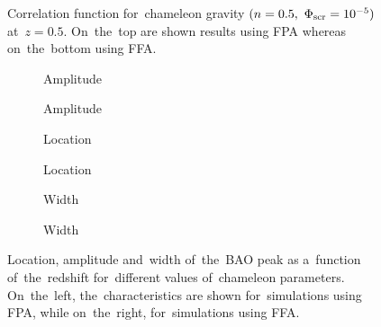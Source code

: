\begin{figure}
\centering
	\begin{subfigure}{1.1\textwidth}
		\chileft
	\end{subfigure}
	\begin{subfigure}{0.9\textwidth}
		\centering
	\end{subfigure}
	\begin{subfigure}{0.9\textwidth}
		\centering
	\end{subfigure}
	\caption{Correlation function for~chameleon gravity $(n=0.5,\ \Phi_{\text{\scriptsize scr}}=10^{-5})$ at~$z=0.5$. On~the~top are shown results using FPA whereas on~the~bottom using FFA.}
	\label{fig:chi_corr_func}
\end{figure}

\begin{figure}
\centering
	\begin{subfigure}{1.2\textwidth}
		\chileft
	\end{subfigure}
	\begin{subfigure}{0.5\textwidth}
		\caption{Amplitude}
	\end{subfigure}
	\begin{subfigure}{0.5\textwidth}
		\caption{Amplitude}
	\end{subfigure}
	\begin{subfigure}{0.5\textwidth}
		\caption{Location}
	\end{subfigure}
	\begin{subfigure}{0.5\textwidth}
		\caption{Location}
	\end{subfigure}
	\begin{subfigure}{0.5\textwidth}
		\caption{Width}
	\end{subfigure}
	\begin{subfigure}{0.5\textwidth}
		\caption{Width}
	\end{subfigure}
	\caption{Location, amplitude and~width of~the~BAO peak as a~function of~the~redshift for~different values of~chameleon parameters. On~the~left, the~characteristics are shown for~simulations using FPA, while on~the~right, for~simulations using FFA.}
	\label{fig:chi_corr_peak}
\end{figure}

